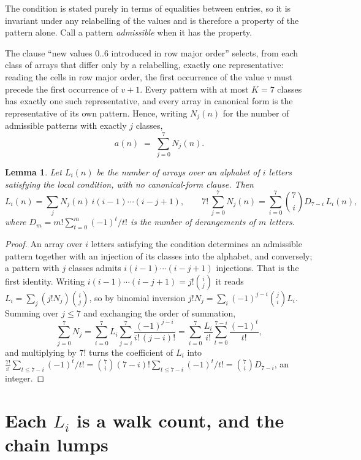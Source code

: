 \documentclass[11pt,a4paper]{article}
\theoremstyle{plain}
\newtheorem{lemma}[theorem]{Lemma}
\theoremstyle{definition}
\begin{document}
The condition is stated purely in terms of equalities between entries, so it is invariant
under any relabelling of the values and is therefore a property of the pattern alone. Call a
pattern \emph{admissible} when it has the property.

The clause ``new values $0..6$ introduced in row major order'' selects, from each class
of arrays that differ only by a relabelling, exactly one representative: reading the cells in
row major order, the first occurrence of the value $v$ must precede the first occurrence of
$v+1$. Every pattern with at most $K=7$ classes has exactly one such representative, and
every array in canonical form is the representative of its own pattern. Hence, writing
$N_j(n)$ for the number of admissible patterns with exactly $j$ classes,
\begin{equation}\label{eq:apat}
a(n)\;=\;\sum_{j=0}^{7}N_j(n).
\end{equation}

\begin{lemma}\label{lem:inv}
Let $L_i(n)$ be the number of arrays over an alphabet of $i$ letters satisfying the local
condition, with no canonical-form clause. Then
\[
L_i(n)=\sum_j N_j(n)\,i(i-1)\cdots(i-j+1),
\qquad
7!\,\sum_{j=0}^{7}N_j(n)=\sum_{i=0}^{7}\binom{7}{i}D_{7-i}\,L_i(n),
\]
where $D_m=m!\sum_{t=0}^{m}(-1)^t/t!$ is the number of derangements of $m$ letters.
\end{lemma}

\begin{proof}
An array over $i$ letters satisfying the condition determines an admissible pattern together
with an injection of its classes into the alphabet, and conversely; a pattern with $j$
classes admits $i(i-1)\cdots(i-j+1)$ injections. That is the first identity. Writing
$i(i-1)\cdots(i-j+1)=j!\binom{i}{j}$ it reads $L_i=\sum_j (j!N_j)\binom{i}{j}$, so by
binomial inversion $j!N_j=\sum_{i}(-1)^{j-i}\binom{j}{i}L_i$. Summing over
$j\le 7$ and exchanging the order of summation,
\[
\sum_{j=0}^{7}N_j=\sum_{i=0}^{7}L_i\sum_{j=i}^{7}\frac{(-1)^{j-i}}{i!\,(j-i)!}
=\sum_{i=0}^{7}\frac{L_i}{i!}\sum_{t=0}^{7-i}\frac{(-1)^t}{t!} ,
\]
and multiplying by $7!$ turns the coefficient of $L_i$ into
$\frac{7!}{i!}\sum_{t\le 7-i}(-1)^t/t!=\binom{7}{i}(7-i)!\sum_{t\le 7-i}(-1)^t/t!
=\binom{7}{i}D_{7-i}$, an integer.
\end{proof}

\section{Each $L_i$ is a walk count, and the chain lumps}
\end{document}
